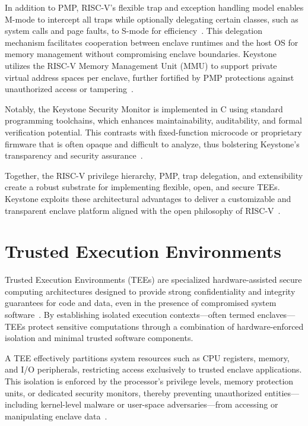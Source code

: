 In addition to PMP, RISC-V’s flexible trap and exception handling model enables M-mode to intercept all traps while optionally delegating certain classes, such as system calls and page faults, to S-mode for efficiency~\cite{Lee2019}. This delegation mechanism facilitates cooperation between enclave runtimes and the host OS for memory management without compromising enclave boundaries. Keystone utilizes the RISC-V Memory Management Unit (MMU) to support private virtual address spaces per enclave, further fortified by PMP protections against unauthorized access or tampering~\cite{Lee2019}.

Notably, the Keystone Security Monitor is implemented in C using standard programming toolchains, which enhances maintainability, auditability, and formal verification potential. This contrasts with fixed-function microcode or proprietary firmware that is often opaque and difficult to analyze, thus bolstering Keystone’s transparency and security assurance~\cite{Lee2019}.

Together, the RISC-V privilege hierarchy, PMP, trap delegation, and extensibility create a robust substrate for implementing flexible, open, and secure TEEs. Keystone exploits these architectural advantages to deliver a customizable and transparent enclave platform aligned with the open philosophy of RISC-V~\cite{Survey2023}.

\section{Trusted Execution Environments}

Trusted Execution Environments (TEEs) are specialized hardware-assisted secure computing architectures designed to provide strong confidentiality and integrity guarantees for code and data, even in the presence of compromised system software~\cite{Survey2023,suzaki2021tsperf}. By establishing isolated execution contexts—often termed enclaves—TEEs protect sensitive computations through a combination of hardware-enforced isolation and minimal trusted software components.

A TEE effectively partitions system resources such as CPU registers, memory, and I/O peripherals, restricting access exclusively to trusted enclave applications. This isolation is enforced by the processor’s privilege levels, memory protection units, or dedicated security monitors, thereby preventing unauthorized entities—including kernel-level malware or user-space adversaries—from accessing or manipulating enclave data~\cite{brasser2020enclave}.

